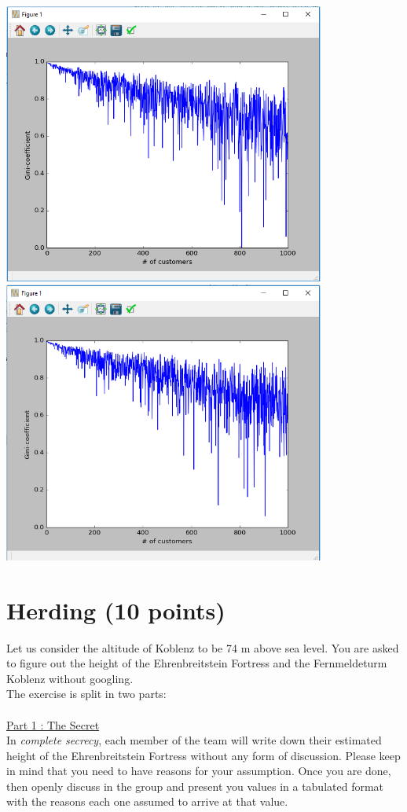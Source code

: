 \documentclass{WeSTassignment}
\begin{document}
\includegraphics[width=400px]{4thPlot}\\
\includegraphics[width=400px]{5thPlot}\\




\section{Herding (10 points)}
Let us consider the altitude of Koblenz to be 74 m above sea level. You are asked to figure out the height of the Ehrenbreitstein Fortress and the Fernmeldeturm Koblenz without googling.\\
The exercise is split in two parts:\\ \\
\underline{Part 1 : The Secret}\\
In \textit{complete secrecy}, each member of the team will write down their estimated height of the Ehrenbreitstein Fortress without any form of discussion. Please keep in mind that you need to have reasons for your assumption. Once you are done, then openly discuss in the group and present you values in a tabulated format with the reasons each one assumed to arrive at that value. 
\end{document}
